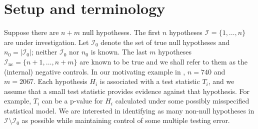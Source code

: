 \documentclass[a4paper,11pt]{article}
\theoremstyle{plain}
\theoremstyle{definition}
\def\calI{\mathcal{I}}
\theoremstyle{plain}
\newcommand{\No}{{n}}
\newcommand{\NoNull}{{n_0}}
\newcommand{\NoNc}{m}
\newcommand{\testStatistics}[1]{{T_{#1}}}
\newcommand{\ncTestStatistics}[1]{{C_{#1}}}
\newcommand{\hypothesis}[1]{{H_{#1}}}
\newcommand{\hypothesisIndex}[1]{{\calI_{#1}}}
\newcommand{\nullHypothesisIndex}{{\calI_{0}}}
\newcommand{\ncHypothesis}[1]{{H^{\text{nc}}_{#1}}}
\begin{document}
\section{Setup and terminology}
\label{sec:setup-terminology}

Suppose there
are $\No + \NoNc$ null hypotheses. The first $\No$
hypotheses $\hypothesisIndex{} = \{1,\dotsc,\No\}$ are under
investigation. Let $\nullHypothesisIndex$ denote the set of true
null hypotheses and $\NoNull = |\nullHypothesisIndex|$; neither
$\nullHypothesisIndex$ nor $\NoNull$ is known. The last $\NoNc$ hypotheses $\hypothesisIndex{\text{nc}} =
\{\No+1,\dotsc,\No+m\}$ are known to be true and we shall refer to
them as the (internal) negative controls. In our motivating example in
, $\No = 740$ and $\NoNc = 2067$. Each
hypothesis $\hypothesis{i}$ is
associated with a test statistic $\testStatistics{i}$, and we assume
that a small test statistic provides evidence against that
hypothesis. For example, $\testStatistics{i}$ can be a p-value for
$\hypothesis{i}$ calculated under some possibly misspecified
statistical model. We are interested in identifying as many non-null
hypotheses in $\hypothesisIndex{} \setminus \nullHypothesisIndex$ as
possible while maintaining control of some multiple testing error.
\end{document}
